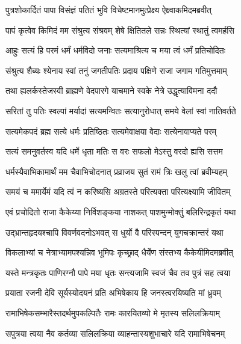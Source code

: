 
\twolineshloka
{पुत्रशोकार्दितं पापा विसंज्ञं पतितं भुवि}
{विचेष्टमानमुत्प्रेक्ष्य ऐक्ष्वाकमिदमब्रवीत्} %

\twolineshloka
{पापं कृत्वेव किमिदं मम संश्रुत्य संश्रवम्}
{शेषे क्षितितले सन्नः स्थित्यां स्थातुं त्वमर्हसि} %

\twolineshloka
{आहुः सत्यं हि परमं धर्मं धर्मविदो जनाः}
{सत्यमाश्रित्य च मया त्वं धर्मं प्रतिचोदितः} %

\twolineshloka
{संश्रुत्य शैब्यः श्येनाय स्वां तनुं जगतीपतिः}
{प्रदाय पक्षिणे राजा जगाम गतिमुत्तमाम्} %

\twolineshloka
{तथा ह्यलर्कस्तेजस्वी ब्राह्मणे वेदपारगे}
{याचमाने स्वके नेत्रे उद्धृत्याविमना ददौ} %

\twolineshloka
{सरितां तु पतिः स्वल्पां मर्यादां सत्यमन्वितः}
{सत्यानुरोधात् समये वेलां स्वां नातिवर्तते} %

\twolineshloka
{सत्यमेकपदं ब्रह्म सत्ये धर्मः प्रतिष्ठितः}
{सत्यमेवाक्षया वेदाः सत्येनावाप्यते परम्} %

\twolineshloka
{सत्यं समनुवर्तस्व यदि धर्मे धृता मतिः}
{स वरः सफलो मेऽस्तु वरदो ह्यसि सत्तम} %

\twolineshloka
{धर्मस्यैवाभिकामार्थं मम चैवाभिचोदनात्}
{प्रव्राजय सुतं रामं त्रिः खलु त्वां ब्रवीम्यहम्} %

\twolineshloka
{समयं च ममार्येमं यदि त्वं न करिष्यसि}
{अग्रतस्ते परित्यक्ता परित्यक्ष्यामि जीवितम्} %

\twolineshloka
{एवं प्रचोदितो राजा कैकेय्या निर्विशङ्कया}
{नाशकत् पाशमुन्मोक्तुं बलिरिन्द्रकृतं यथा} %

\twolineshloka
{उद्भ्रान्तहृदयश्चापि विवर्णवदनोऽभवत्}
{स धुर्यो वै परिस्पन्दन् युगचक्रान्तरं यथा} %

\twolineshloka
{विकलाभ्यां च नेत्राभ्यामपश्यन्निव भूमिपः}
{कृच्छ्राद् धैर्येण संस्तभ्य कैकेयीमिदमब्रवीत्} %

\twolineshloka
{यस्ते मन्त्रकृतः पाणिरग्नौ पापे मया धृतः}
{सन्त्यजामि स्वजं चैव तव पुत्रं सह त्वया} %

\twolineshloka
{प्रयाता रजनी देवि सूर्यस्योदयनं प्रति}
{अभिषेकाय हि जनस्त्वरयिष्यति मां ध्रुवम्} %

\twolineshloka
{रामाभिषेकसम्भारैस्तदर्थमुपकल्पितैः}
{रामः कारयितव्यो मे मृतस्य सलिलक्रियाम्} %

\twolineshloka
{सपुत्रया त्वया नैव कर्तव्या सलिलक्रिया}
{व्याहन्तास्यशुभाचारे यदि रामाभिषेचनम्} %

